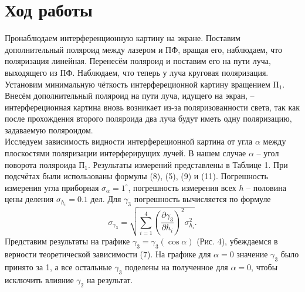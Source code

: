 \documentclass[a4paper,12pt]{article}
\begin{document}
\section*{Ход работы}
Пронаблюдаем интерференционную картину на экране. Поставим дополнительный поляроид между лазером и ПФ, вращая его, наблюдаем, что поляризация линейная. Перенесём поляроид и поставим его на пути луча, выходящего из ПФ. Наблюдаем, что теперь у луча круговая поляризация. Установим минимальную чёткость интерфереционной картину вращением $\text{П}_1$. Внесём дополнительный поляроид на пути луча, идущего на экран, -- интерфереционная картина вновь возникает из-за поляризованности света, так как после прохождения второго поляроида два луча будут иметь одну поляризацию, задаваемую поляроидом.\\
Исследуем зависимость видности интерфереционной картина от угла $\alpha$ между плоскостями поляризации интерферирущих лучей. В нашем случае $\alpha$ -- угол поворота поляроида $\text{П}_1$. Результаты измерений представлены в Таблице 1. При подсчётах были использованы формулы (8), (5), (9) и (11). Погрешность измерения угла приборная $\sigma_\alpha = 1^\circ$, погрешность измерения всех $h$ -- половина цены деления $\sigma_{h_i} = 0.1 \text{ дел}$. Для $\gamma_3$ погрешность вычисляется по формуле
$$
\sigma_{\gamma_3} = \sqrt{\sum\limits_{i=1}^4\left(\dfrac{\partial \gamma_3}{\partial h_i}\right)^2 \sigma^2_{h_i}}.
$$
Представим результаты на графике $\gamma_3 = \gamma_3(\cos \alpha)$ (Рис. 4), убеждаемся в верности теоретической зависимости (7). На графике для $\alpha = 0$ значение $\gamma_3$ было принято за 1, а все остальные $\gamma_3$ поделены на полученное для $\alpha = 0$, чтобы исключить влияние $\gamma_2$ на результат.
\newpage
\end{document}
